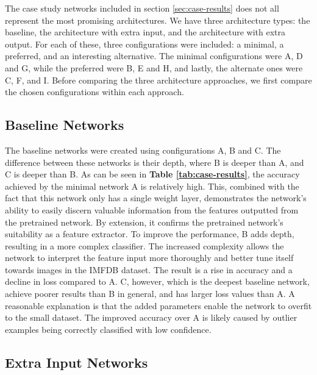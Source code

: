 The case study networks included in section \ref{sec:case-results} does not all represent the most promising architectures. We have three architecture types: the baseline, the architecture with extra input, and the architecture with extra output. For each of these, three configurations were included: a minimal, a preferred, and an interesting alternative. The minimal configurations were A, D and G, while the preferred were B, E and H, and lastly, the alternate ones were C, F, and I. Before comparing the three architecture approaches, we first compare the chosen configurations within each approach.

\subsection{Baseline Networks}

The baseline networks were created using configurations A, B and C. The difference between these networks is their depth, where B is deeper than A, and C is deeper than B. As can be seen in \textbf{Table \ref{tab:case-results}}, the accuracy achieved by the minimal network A is relatively high. This, combined with the fact that this network only has a single weight layer, demonstrates the network's ability to easily discern valuable information from the features outputted from the pretrained network. By extension, it confirms the pretrained network's suitability as a feature extractor. To improve the performance, B adds depth, resulting in a more complex classifier. The increased complexity allows the network to interpret the feature input more thoroughly and better tune itself towards images in the IMFDB dataset. The result is a rise in accuracy and a decline in loss compared to A. C, however, which is the deepest baseline network, achieve poorer results than B in general, and has larger loss values than A. A reasonable explanation is that the added parameters enable the network to overfit to the small dataset. The improved accuracy over A is likely caused by outlier examples being correctly classified with low confidence.

\subsection{Extra Input Networks}

